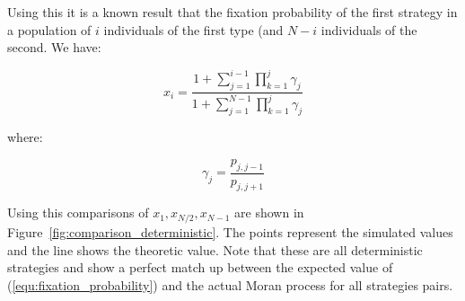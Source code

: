 \documentclass{article}
\begin{document}
Using this it is a known result that the fixation probability of the first
strategy in a population of \(i\) individuals of the first type (and \(N-i\)
individuals of the second. We have:

\begin{equation}\label{equ:fixation_probability}
x_i = \frac{1 + \sum_{j=1}^{i-1}\prod_{k=1}^{j}\gamma_j}{1 + \sum_{j=1}^{N-1}
      \prod_{k=1}^{j}\gamma_j}
\end{equation}

where:

\[
\gamma_j = \frac{p_{j, j-1}}{p_{j, j+1}}
\]

Using this comparisons of \(x_1, x_{N/2}, x_{N-1}\) are shown in
Figure~\ref{fig:comparison_deterministic}. The points represent the simulated
values and the line shows the theoretic value. Note that these are all
deterministic strategies and show a perfect match up between the expected value
of (\ref{equ:fixation_probability}) and the actual Moran process for all
strategies pairs.
\end{document}
